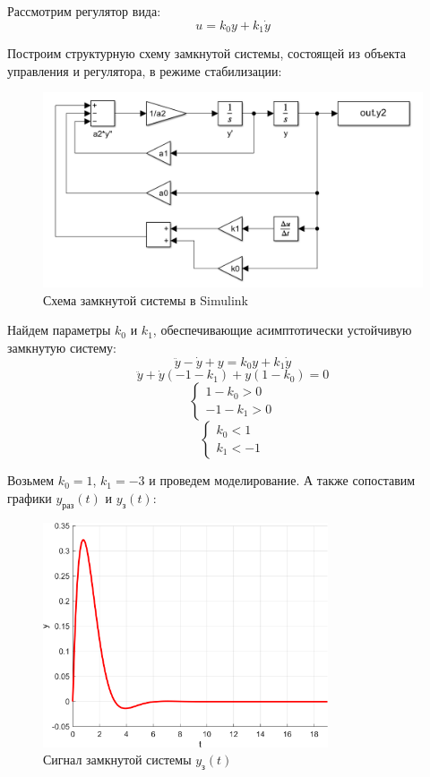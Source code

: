 Рассмотрим регулятор вида:
\[
u = k_0y + k_1\dot{y}
\]

Построим структурную схему замкнутой системы, состоящей из объекта 
управления и регулятора, в режиме стабилизации:

\begin{figure}[H]
    \centering
    \includegraphics[width=1\textwidth, trim={0cm 0cm 0cm 0cm}]{../images/sim2.png}
    \caption{Схема замкнутой системы в Simulink}
\end{figure}

Найдем параметры $k_0$ и $k_1$, обеспечивающие асимптотически устойчивую замкнутую систему: 
\[
\ddot{y} - \dot{y} + y = k_0y + k_1\dot{y}
\]
\[
\ddot{y} + \dot{y}(-1 - k_1) + y(1 - k_0) = 0
\]
\[
\begin{cases}
    1 - k_0 > 0 \\
    -1 - k_1 > 0
\end{cases}
\]
\[
\begin{cases}
    k_0 < 1 \\
    k_1 < -1
\end{cases}
\]

Возьмем $k_0 = 1$, $k_1 = -3$ и проведем моделирование. А также сопоставим графики $y_{\text{раз}}(t)$ и $y_{\text{з}}(t)$:
\begin{figure}[H]
    \centering
    \includegraphics[width=0.75\textwidth, trim={0cm 0cm 0cm 0cm}]{../images/1_2.png}
    \caption{Сигнал замкнутой системы $y_{\text{з}}(t)$}
\end{figure}

